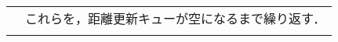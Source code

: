\newpage
\begin{tabular}{cp{8cm}}
  \raisebox{-.8\totalheight}{\fbox{
    \def\svgwidth{.35\linewidth}
    
  }}
  &
  これらを，距離更新キューが空になるまで繰り返す．
  \\
  \raisebox{-.8\totalheight}{\fbox{
    \def\svgwidth{.35\linewidth}
    
  }}
  &
\end{tabular}

\egroup
